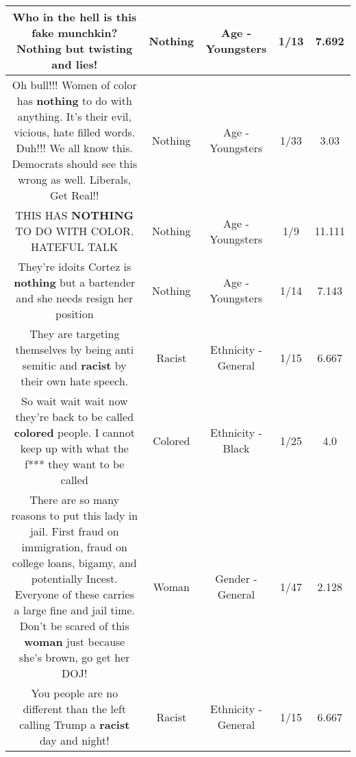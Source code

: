 \documentclass[11pt]{article}
\newlength\mylength
\begin{document}
\begin{center}
\begin{longtable}{|C{.65\mylength}|C{.30\mylength}|C{.12\mylength}|C{.12\mylength}|C{.12\mylength}|}
  \small Who in the hell is this fake munchkin? \textbf{Nothing} but twisting and lies!\normalsize   & Nothing & Age - Youngsters & 1/13 & 7.692 \\  \hline
  \small Oh bull!!! Women of color has \textbf{nothing} to do with anything. It's their evil, vicious, hate filled words. Duh!!! We all know this. Democrats should see this wrong as well. Liberals, Get Real!!\normalsize   & Nothing & Age - Youngsters & 1/33 & 3.03 \\  \hline
  \small THIS HAS \textbf{NOTHING} TO DO WITH COLOR. HATEFUL TALK\normalsize   & Nothing & Age - Youngsters & 1/9 & 11.111 \\  \hline
  \small They're idoits Cortez is \textbf{nothing} but a bartender and she needs resign her position\normalsize   & Nothing & Age - Youngsters & 1/14 & 7.143 \\  \hline
  \small They are targeting themselves by being anti semitic and \textbf{racist} by their own hate speech.\normalsize   & Racist & Ethnicity - General & 1/15 & 6.667 \\  \hline
  \small So wait wait wait now they're back to be called \textbf{colored} people. I cannot keep up with what the f*** they want to be called\normalsize   & Colored & Ethnicity - Black & 1/25 & 4.0 \\  \hline
  \small There are so many reasons to put this lady in jail. First fraud on immigration, fraud on college loans, bigamy, and potentially Incest. Everyone of these carries a large fine and jail time. Don't be scared of this \textbf{woman} just because she's brown, go get her DOJ!\normalsize   & Woman & Gender - General & 1/47 & 2.128 \\  \hline
  \small You people are no different than the left calling Trump a \textbf{racist} day and night!\normalsize   & Racist & Ethnicity - General & 1/15 & 6.667 \\  \hline

\end{longtable}
\end{center}
\end{document}
